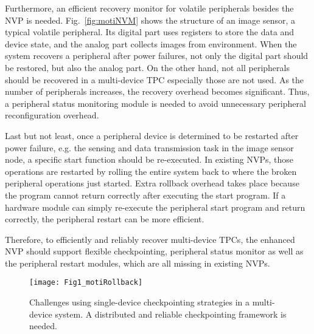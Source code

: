 Furthermore, an efficient recovery monitor for volatile peripherals besides the NVP is needed.
Fig.~\ref{fig:motiNVM} shows the structure of an image sensor, a typical volatile peripheral.
Its digital part uses registers to store the data and device state, and the analog part collects images from environment.
When the system recovers a peripheral after power failures, not only the digital part should be restored, but also the analog part. 
On the other hand, not all peripherals should be recovered in a multi-device TPC especially those are not used. 
As the number of peripherals increases, the recovery overhead becomes significant. 
Thus, a peripheral status monitoring module is needed to avoid unnecessary peripheral reconfiguration overhead.

Last but not least, once a peripheral device is determined to be restarted after power failure, e.g. the sensing and data transmission task in the image sensor node, a specific start function should be re-executed. 
In existing NVPs, those operations are restarted by rolling the entire system back to where the broken peripheral operations just started. Extra rollback overhead takes place because the program cannot return correctly after executing the start program. If a hardware module can simply re-execute the peripheral start program and return correctly, the peripheral restart can be more efficient.

Therefore, to efficiently and reliably recover multi-device TPCs, the enhanced NVP should support flexible checkpointing, peripheral status monitor as well as the peripheral restart modules, which are all missing in existing NVPs.

%   
\begin{figure}[t]
    \centering
    \texttt{[image: Fig1\_motiRollback]}
    \caption{Challenges using single-device checkpointing strategies in a multi-device system. A distributed and reliable checkpointing framework is needed.}
    \label{fig:motiRollback}
\end{figure}

